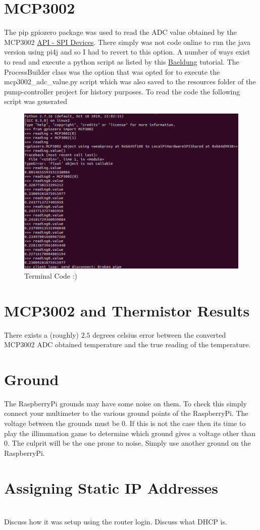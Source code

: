 \documentclass{article}
\begin{document}
	\section{MCP3002} %
	\label{sec:mcp3002}
	The pip gpiozero package was used to read the ADC value obtained by the MCP3002 \href{https://gpiozero.readthedocs.io/en/stable/api_spi.html}{API - SPI Devices}. There simply was not code online to run the java version using pi4j and so I had to revert to this option. A number of ways exist to read and execute a python script as listed by this \href{https://www.baeldung.com/java-working-with-python}{Baeldung} tutorial. The ProcessBuilder class was the option that was opted for to execute the mcp3002\_adc\_value.py script which was also saved to the resources folder of the pump-controller project for history purposes. To read the code the following script was generated 
	\begin{figure}[H]
	\centering
	\includegraphics[width=\textwidth]{images/mcp3002_gpiozero_code_read_adc.png}
	\caption{Terminal Code :)}	
	\end{figure}


	

	\section{MCP3002 and Thermistor Results}
	There exists a (roughly) $2.5$ degrees celsius error between the converted MCP3002 ADC obtained temperature and the true reading of the temperature.

	\section{Ground} %
	\label{sec:ground}
	The RaspberryPi grounds may have some noise on them. To check this simply connect your multimeter to the various ground points of the RaspberryPi. The voltage between the grounds must be 0. If this is not the case then its time to play the illimunation game to determine which ground gives a voltage other than 0. The culprit will be the one prone to noise. Simply use another ground on the RaspberryPi. \\

	\section{Assigning Static IP Addresses}\\
	Discuss how it was setup using the router login. Discuss what DHCP is.
	
\end{document}
